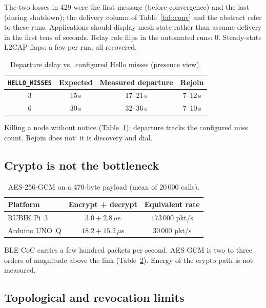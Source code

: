 \documentclass[conference,10pt]{IEEEtran}
\begin{document}
The two losses in 429 were the first message (before convergence) and the
last (during shutdown); the delivery column of Table~\ref{tab:conv} and
the abstract refer to these runs. Applications should display mesh state rather
than assume delivery in the first tens of seconds. Relay role flips in
the automated runs: 0. Steady-state L2CAP flaps: a few per run, all
recovered.

\begin{table}[t]
\centering
\caption{Departure delay vs.\ configured Hello misses (presence view).}
\label{tab:misses}
\begin{tabular}{@{}cccc@{}}
\toprule
\texttt{HELLO\_MISSES} & Expected & Measured departure & Rejoin \\
\midrule
3 & 15\,s & 17--21\,s & 7--12\,s \\
6 & 30\,s & 32--36\,s & 7--10\,s \\
\bottomrule
\end{tabular}
\end{table}

Killing a node without notice (Table~\ref{tab:misses}): departure tracks
the configured miss count. Rejoin does not: it is discovery and dial.

\subsection{Crypto is not the bottleneck}

\begin{table}[t]
\centering
\caption{AES-256-GCM on a 470-byte payload (mean of 20\,000 calls).}
\label{tab:crypto}
\begin{tabular}{@{}lcc@{}}
\toprule
Platform & Encrypt + decrypt & Equivalent rate \\
\midrule
RUBIK Pi~3 & $3.0+2.8\,\mu$s & $173\,000$ pkt/s \\
Arduino UNO~Q & $18.2+15.2\,\mu$s & $30\,000$ pkt/s \\
\bottomrule
\end{tabular}
\end{table}

BLE CoC carries a few hundred packets per second. AES-GCM is two to three
orders of magnitude above the link (Table~\ref{tab:crypto}). Energy of
the crypto path is not measured.

\subsection{Topological and revocation limits}
\end{document}
